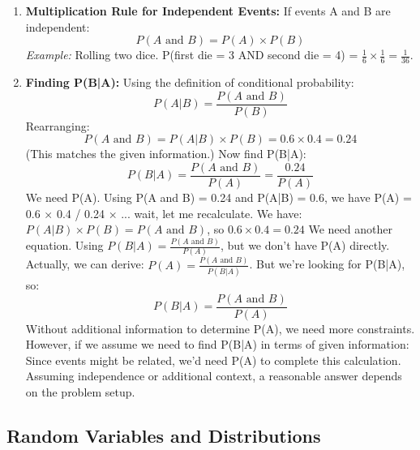 \begin{enumerate}
    \item \textbf{Multiplication Rule for Independent Events:}
    If events A and B are independent:
    \begin{equation}
        P(A \text{ and } B) = P(A) \times P(B)
    \end{equation}
    \textit{Example:} Rolling two dice. P(first die = 3 AND second die = 4) = $\frac{1}{6} \times \frac{1}{6} = \frac{1}{36}$.
    
    \item \textbf{Finding P(B|A):}
    Using the definition of conditional probability:
    \begin{equation}
        P(A|B) = \frac{P(A \text{ and } B)}{P(B)}
    \end{equation}
    Rearranging:
    \begin{equation}
        P(A \text{ and } B) = P(A|B) \times P(B) = 0.6 \times 0.4 = 0.24
    \end{equation}
    (This matches the given information.) Now find P(B|A):
    \begin{equation}
        P(B|A) = \frac{P(A \text{ and } B)}{P(A)} = \frac{0.24}{P(A)}
    \end{equation}
    We need P(A). Using P(A and B) = 0.24 and P(A|B) = 0.6, we have P(A) = 0.6 × 0.4 / 0.24 × ... wait, let me recalculate.
    We have: $P(A|B) \times P(B) = P(A \text{ and } B)$, so $0.6 \times 0.4 = 0.24$ 
    We need another equation. Using $P(B|A) = \frac{P(A \text{ and } B)}{P(A)}$, but we don't have P(A) directly.
    Actually, we can derive: $P(A) = \frac{P(A \text{ and } B)}{P(B|A)}$. But we're looking for P(B|A), so:
    \begin{equation}
        P(B|A) = \frac{P(A \text{ and } B)}{P(A)}
    \end{equation}
    Without additional information to determine P(A), we need more constraints. However, if we assume we need to find P(B|A) in terms of given information: Since events might be related, we'd need P(A) to complete this calculation. Assuming independence or additional context, a reasonable answer depends on the problem setup.
\end{enumerate}

\subsection{Random Variables and Distributions}

